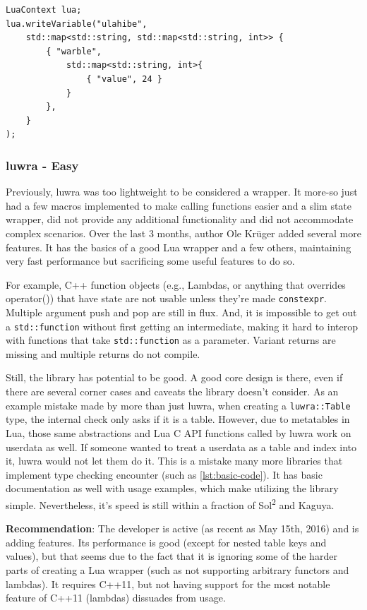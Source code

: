 \documentclass[conference,compsoc]{IEEEtran}
\newcommand{\soltwo}{Sol\textsuperscript{2}}
\begin{document}
\begin{lstlisting}[caption={luawrapper code to write a nested table. This does not compose well or scale up.},
label={lst:luawrapper-code}]
LuaContext lua;
lua.writeVariable("ulahibe", 
	std::map<std::string, std::map<std::string, int>> {
		{ "warble", 
			std::map<std::string, int>{ 
				{ "value", 24 }
			} 
		},
	}
);
\end{lstlisting}

\subsubsection{luwra - Easy}\label{sssec:luwra}

Previously, luwra\cite{luwra} was too lightweight to be considered a wrapper. It more-so just had a few macros implemented to make calling functions easier and a slim state wrapper, did not provide any additional functionality and did not accommodate complex scenarios. Over the last 3 months, author Ole Krüger added several more features. It has the basics of a good Lua wrapper and a few others, maintaining very fast performance but sacrificing some useful features to do so.

For example, C++ function objects (e.g., Lambdas, or anything that overrides operator()) that have state are not usable unless they're made \lstinline|constexpr|. Multiple argument push and pop are still in flux. And, it is impossible to get out a \lstinline|std::function| without first getting an intermediate, making it hard to interop with functions that take \lstinline|std::function| as a parameter. Variant returns are missing and multiple returns do not compile.

Still, the library has potential to be good. A good core design is there, even if there are several corner cases and caveats the library doesn't consider. As an example mistake made by more than just luwra, when creating a \lstinline|luwra::Table| type, the internal check only asks if it is a table. However, due to metatables in Lua, those same abstractions and Lua C API functions called by luwra work on userdata as well. If someone wanted to treat a userdata as a table and index into it, luwra would not let them do it. This is a mistake many more libraries that implement type checking encounter (such as \cref{lst:basic-code}). It has basic documentation as well with usage examples, which make utilizing the library simple. Nevertheless, it's speed is still within a fraction of \soltwo{} and Kaguya. 

\textbf{Recommendation}: The developer is active (as recent as May 15th, 2016) and is adding features. Its performance is good (except for nested table keys and values), but that seems due to the fact that it is ignoring some of the harder parts of creating a Lua wrapper (such as not supporting arbitrary functors and lambdas). It requires C++11, but not having support for the most notable feature of C++11 (lambdas) dissuades from usage.
\end{document}
